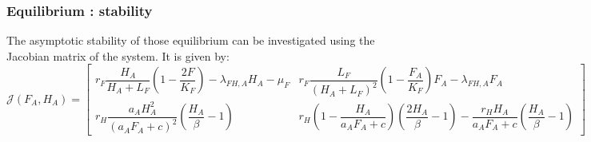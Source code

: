 \documentclass{article}
\newcommand{\lfa}{\lambda_{FH, A}}
\begin{document}
\subsubsection{Equilibrium : stability}

The asymptotic stability of those equilibrium can be investigated using the Jacobian matrix of the system.
It is given by:
\begin{equation}
\mathcal{J}(F_A,H_A) =  \begin{bmatrix}
r_F \dfrac{H_A}{H_A+L_F}(1-\dfrac{2F}{K_F}) - \lfa H_A - \mu_F & r_F \dfrac{L_F}{(H_A+L_F)^2}(1-\dfrac{F_A}{K_F})F_A  - \lfa F_A\\
r_H \dfrac{a_AH_A^2}{(a_AF_A+c)^2} (\dfrac{H_A}{\beta}-1) & r_H(1-\dfrac{H_A}{a_AF_A+c})(\dfrac{2H_A}{\beta}-1) - \dfrac{r_H H_A}{a_AF_A+c}(\dfrac{H_A}{\beta}-1)
\end{bmatrix}
\label{stabilityFAHA:jacobian}
\end{equation}
\end{document}
